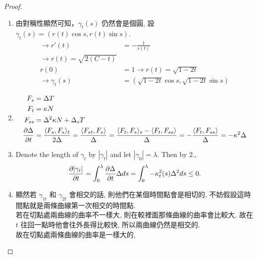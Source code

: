 \documentclass[10pt,a4paper]{article}
\begin{document}
\begin{proof}
\begin{enumerate}
\item 
由對稱性顯然可知，$\gamma_t(s)$ 仍然會是個圓, 設 $\gamma_t(s)=(r(t)\cos s, r(t)\sin s)$.\\
\begin{align*}
\rightarrow r'(t)&=-\frac{1}{r(t)}\\
\rightarrow r(t)=\sqrt{2(C-t)}\\
r(0)&=1 \rightarrow r(t)=\sqrt{1-2t}\\
\rightarrow \gamma_t(s)&=(\sqrt{1-2t}\cos s, \sqrt{1-2t}\sin s)
\end{align*}
\item 
\begin{align*}
F_s &= \Delta T \\
F_t &= \kappa N \\
F_{ss} &= \Delta^2\kappa N + \Delta_sT\\
\frac{\partial \Delta}{\partial t}&=\frac{\langle F_s, F_s\rangle_t}{2\Delta}=\frac{\langle F_{st}, F_s\rangle}{\Delta}=\frac{\langle F_t, F_s\rangle_s-\langle F_{t}, F_{ss}\rangle}{\Delta}=-\frac{\langle F_t, F_{ss}\rangle}{\Delta}=-\kappa^2\Delta
\end{align*}
\item Denote the length of $\gamma_t$ by $|\gamma_t|$ and let $|\gamma_0|=\lambda$. Then by 2., $$\frac{\partial |\gamma_t|}{\partial t} =\int_0^{\lambda}\frac{\partial \Delta}{\partial t}\Delta ds = \int_0^{\lambda}-\kappa_t^2(s)\Delta^2 ds \leq 0.$$
\item
顯然若 $\gamma_{1t}$ 和 $\gamma_{2t}$ 會相交的話, 則他們在某個時間點會是相切的, 不妨假設這時間點就是兩條曲線第一次相交的時間點.\\
若在切點處兩曲線的曲率不一樣大, 則在較裡面那條曲線的曲率會比較大, 故在 $t$ 往回一點時他會往外長得比較快, 所以兩曲線仍然是相交的.\\
故在切點處兩條曲線的曲率是一樣大的, 
\end{enumerate}
\end{proof}
\end{document}
